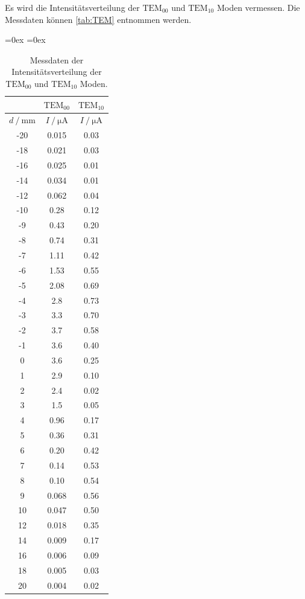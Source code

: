 Es wird die Intensitätsverteilung der $\text{TEM}_{00}$ und $\text{TEM}_{10}$ Moden vermessen. Die Messdaten können \autoref{tab:TEM} entnommen werden.
\begin{table}
  \centering
  \aboverulesep=0ex %
  \belowrulesep=0ex %
  \caption{Messdaten der Intensitätsverteilung der $\text{TEM}_{00}$ und $\text{TEM}_{10}$ Moden.}
  \label{tab:TEM}
  \begin{tabular}{S[table-format = 2.0] | S[table-format = 1.3]  S[table-format = 1.2]}
    {} & {$\text{TEM}_{00}$} & {$\text{TEM}_{10}$} \\
    \midrule
    \rule{0pt}{1.1EM}
    {$d \mathbin{/} \unit{\milli\metre}$} & {$I \mathbin{/} \unit{\micro\ampere}$} & {$I \mathbin{/} \unit{\micro\ampere}$} \\
    \midrule
    \rule{0pt}{1.1EM}
    -20 & 0.015 & 0.03 \\
    -18 & 0.021 & 0.03 \\
    -16 & 0.025 & 0.01 \\
    -14 & 0.034 & 0.01 \\
    -12 & 0.062 & 0.04 \\
    -10 & 0.28  & 0.12 \\
     -9 & 0.43  & 0.20 \\
     -8 & 0.74  & 0.31 \\
     -7 & 1.11  & 0.42 \\
     -6 & 1.53  & 0.55 \\
     -5 & 2.08  & 0.69 \\
     -4 & 2.8   & 0.73 \\
     -3 & 3.3   & 0.70 \\
     -2 & 3.7   & 0.58 \\
     -1 & 3.6   & 0.40 \\
      0 & 3.6   & 0.25 \\
      1 & 2.9   & 0.10 \\
      2 & 2.4   & 0.02 \\
      3 & 1.5   & 0.05 \\
      4 & 0.96  & 0.17 \\
      5 & 0.36  & 0.31 \\
      6 & 0.20  & 0.42 \\
      7 & 0.14  & 0.53 \\
      8 & 0.10  & 0.54 \\
      9 & 0.068 & 0.56 \\
     10 & 0.047 & 0.50 \\
     12 & 0.018 & 0.35 \\
     14 & 0.009 & 0.17 \\
     16 & 0.006 & 0.09 \\
     18 & 0.005 & 0.03 \\
     20 & 0.004 & 0.02 \\
  \end{tabular}
\end{table}

